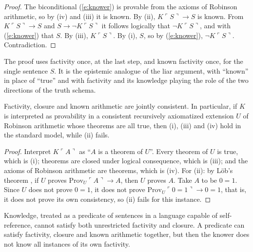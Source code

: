 \documentclass{situationist-preprint}
\begin{document}
\begin{proof}
The biconditional (\ref{e:knower}) is provable from the axioms of Robinson arithmetic, so by (iv) and (iii) it is known. By (ii), $K\ulcorner S\urcorner \rightarrow S$ is known. From $K\ulcorner S\urcorner \rightarrow S$ and $S \rightarrow \neg K\ulcorner S\urcorner$ it follows logically that $\neg K\ulcorner S\urcorner$, and with (\ref{e:knower}) that $S$. By (iii), $K\ulcorner S\urcorner$. By (i), $S$, so by (\ref{e:knower}), $\neg K \ulcorner S\urcorner$. Contradiction.
\end{proof}

The proof uses factivity once, at the last step, and known factivity once, for the single sentence $S$. It is the epistemic analogue of the liar argument, with \enquote{known} in place of \enquote{true} and with factivity and its knowledge playing the role of the two directions of the truth schema.

\begin{proposition}\label{p:consistent}
Factivity, closure and known arithmetic are jointly consistent. In particular, if $K$ is interpreted as provability in a consistent recursively axiomatized extension $U$ of Robinson arithmetic whose theorems are all true, then (i), (iii) and (iv) hold in the standard model, while (ii) fails.
\end{proposition}

\begin{proof}
Interpret $K\ulcorner A\urcorner$ as \enquote{$A$ is a theorem of $U$}. Every theorem of $U$ is true, which is (i); theorems are closed under logical consequence, which is (iii); and the axioms of Robinson arithmetic are theorems, which is (iv). For (ii): by Löb's theorem \citep{Lob1955}, if $U$ proves $\mathrm{Prov}_U\ulcorner A\urcorner \rightarrow A$, then $U$ proves $A$. Take $A$ to be $0 = 1$. Since $U$ does not prove $0 = 1$, it does not prove $\mathrm{Prov}_U\ulcorner 0=1\urcorner \rightarrow 0 = 1$, that is, it does not prove its own consistency, so (ii) fails for this instance.
\end{proof}

\begin{corollary}\label{c:moral}
Knowledge, treated as a predicate of sentences in a language capable of self-reference, cannot satisfy both unrestricted factivity and closure. A predicate can satisfy factivity, closure and known arithmetic together, but then the knower does not know all instances of its own factivity.
\end{corollary}
\end{document}

